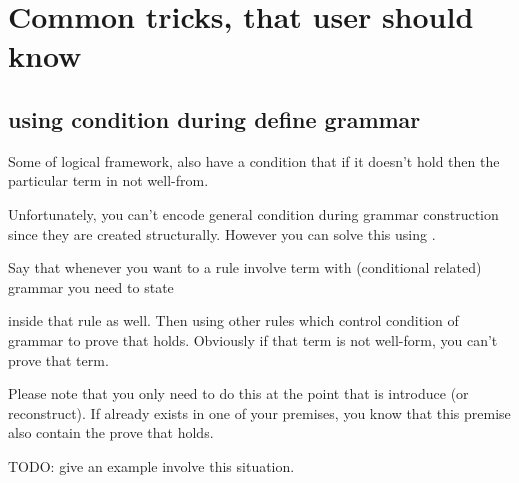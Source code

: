 \documentclass[master.tex]{subfiles}
\begin{document}
\chapter{Common tricks, that user should know}

\section{using condition during define grammar}

Some of logical framework, also have a condition that if it doesn't hold then the particular term in not well-from.

Unfortunately, you can't encode general condition during grammar construction since they are created structurally. However you can solve this using \kRule.

Say that whenever you want to a rule involve term  with (conditional related) grammar  you need to state

\kPremise {} 

inside that rule as well. Then using other rules which control condition of grammar  to prove that  holds. Obviously if that term is not well-form, you can't prove that term.

Please note that you only need to do this at the point that  is introduce (or reconstruct). If  already exists in one of your premises, you know that this premise also contain the prove that  holds.

TODO: give an example involve this situation.
\end{document}
